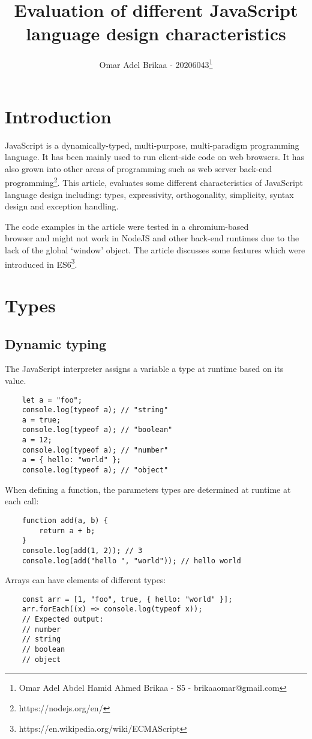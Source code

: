 \documentclass[11pt,a4paper]{article}
\begin{document}
\title{Evaluation of different JavaScript language design characteristics}
\author{Omar Adel Brikaa - 20206043\thanks{Omar Adel Abdel Hamid Ahmed Brikaa - S5 - brikaaomar@gmail.com}}
\date{}
\maketitle

\tableofcontents

\section{Introduction}
JavaScript is a dynamically-typed, multi-purpose, multi-paradigm programming language.
It has been mainly used to run client-side code on web browsers.
It has also grown into other areas of programming such as web server back-end programming\footnote{https://nodejs.org/en/}.
This article, evaluates some different characteristics of JavaScript language design including:
types, expressivity, orthogonality, simplicity, syntax design and exception handling.

The code examples in the article were tested in a chromium-based\\browser and might not work in NodeJS and other back-end
runtimes due to the lack of the global `window' object.
The article discusses some features which were introduced in ES6\footnote{https://en.wikipedia.org/wiki/ECMAScript}.

\section{Types}

\subsection{\label{dynamic_typing}Dynamic typing}
The JavaScript interpreter assigns a variable a type at runtime based on its value.
\begin{verbatim}
    let a = "foo";
    console.log(typeof a); // "string"
    a = true;
    console.log(typeof a); // "boolean"
    a = 12;
    console.log(typeof a); // "number"
    a = { hello: "world" };
    console.log(typeof a); // "object"
\end{verbatim}
When defining a function, the parameters types are determined at runtime at each call:
\begin{verbatim}
    function add(a, b) {
        return a + b;
    }
    console.log(add(1, 2)); // 3
    console.log(add("hello ", "world")); // hello world
\end{verbatim}
Arrays can have elements of different types:
\begin{verbatim}
    const arr = [1, "foo", true, { hello: "world" }];
    arr.forEach((x) => console.log(typeof x));
    // Expected output:
    // number
    // string
    // boolean
    // object
\end{verbatim}
\end{document}
